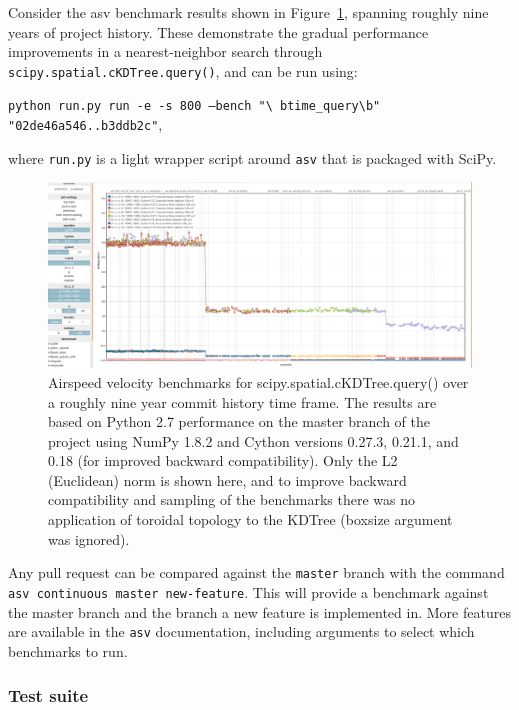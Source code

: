 \documentclass[fleqn,10pt]{wlscirep}
\begin{document}
Consider the asv benchmark results shown in Figure~\ref{fig:asvbench}, spanning
roughly nine years of project history. These demonstrate the gradual
performance improvements in a nearest-neighbor search through
\texttt{scipy.spatial.cKDTree.query()}, and can be run using:

\texttt{python run.py run -e -s 800 --bench "\textbackslash
btime\_query\textbackslash b" "02de46a546..b3ddb2c"},

where \texttt{run.py} is a light wrapper script around \texttt{asv}
that is packaged with SciPy.

\begin{figure}[H]
\centering
\includegraphics[width=\textwidth]{static/asv_time_query_ckdtree}
\caption{Airspeed velocity benchmarks for scipy.spatial.cKDTree.query()
over a roughly nine year commit history time frame. The results are based on
Python 2.7 performance on the master branch of the project using NumPy 1.8.2
and Cython versions 0.27.3, 0.21.1, and 0.18 (for improved backward
compatibility). Only the L2 (Euclidean) norm is shown here, and to improve
backward compatibility and sampling of the benchmarks there was no application
of toroidal topology to the KDTree (boxsize argument was ignored).}
\label{fig:asvbench}
\end{figure}

Any pull request can be compared against the \texttt{master} branch with the
command \texttt{asv continuous master new-feature}. This will provide a
benchmark against the master branch and the branch a new feature is implemented
in. More features are available in the \texttt{asv} documentation\cite{asvdocs}, including 
arguments to select which benchmarks to run.

\subsubsection*{Test suite}
\end{document}
